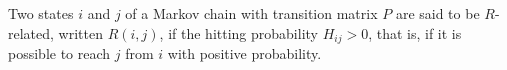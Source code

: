 Two states $i$ and $j$ of a Markov chain with transition matrix $P$ are said to be $R$-related, written $R(i,j)$, if the hitting probability $H_{ij} > 0$, that is, if it is possible to reach $j$ from $i$ with positive probability.
